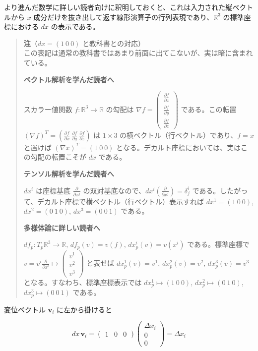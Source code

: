 \documentclass[a4paper,12pt,openany]{book}
\begin{document}
より進んだ数学に詳しい読者向けに釈明しておくと、これは入力された縦ベクトルから
\(x\)
成分だけを抜き出して返す線形演算子の行列表現であり、\(\mathbb R^3\)
の標準座標における \(dx\) の表示である。

\begin{quote}
\textbf{注}（\(dx = (1\ 0\ 0)\) と教科書との対応）\\
この表記は通常の教科書ではあまり前面に出てこないが、実は暗に含まれている。

\textbf{ベクトル解析を学んだ読者へ}

スカラー値関数 \(f:\mathbb R^3\to\mathbb R\) の勾配は
\(\nabla f = \begin{pmatrix}\frac{\partial f}{\partial x} \\ \frac{\partial f}{\partial y} \\ \frac{\partial f}{\partial z}\end{pmatrix}\)
である。この転置
\((\nabla f)^T = (\frac{\partial f}{\partial x}\ \frac{\partial f}{\partial y}\ \frac{\partial f}{\partial z})\)
は \(1\times3\) の横ベクトル（行ベクトル）であり、\(f=x\) と置けば
\((\nabla x)^T = (1\ 0\ 0)\)
となる。デカルト座標においては、実はこの勾配の転置こそが \(dx\) である。

\textbf{テンソル解析を学んだ読者へ}

\(dx^i\) は座標基底 \(\frac{\partial}{\partial x^j}\)
の双対基底なので、\(dx^i\left(\frac{\partial}{\partial x^j}\right)=\delta^i_j\)
である。したがって、デカルト座標で横ベクトル（行ベクトル）表示すれば
\(dx^1=(1\ 0\ 0)\), \(dx^2=(0\ 1\ 0)\), \(dx^3=(0\ 0\ 1)\) である。

\textbf{多様体論に詳しい読者へ}

\(df_p:T_p\mathbb R^3\to\mathbb R\), \(df_p(v)=v(f)\),
\(dx^i_p(v)=v(x^i)\) である。標準座標で
\(v=v^i\frac{\partial}{\partial x^i} \longmapsto \begin{pmatrix}v^1\\v^2\\v^3\end{pmatrix}\)
と表せば \(dx^1_p(v)=v^1\), \(dx^2_p(v)=v^2\), \(dx^3_p(v)=v^3\)
となる。すなわち、標準座標表示では \(dx^1_p\longmapsto(1\ 0\ 0)\),
\(dx^2_p\longmapsto(0\ 1\ 0)\), \(dx^3_p\longmapsto(0\ 0\ 1)\) である。
\end{quote}

変位ベクトル \(\mathbf{v}_i\) に左から掛けると

\[
dx\,\mathbf{v}_i
=
\begin{pmatrix} 1 & 0 & 0 \end{pmatrix}
\begin{pmatrix} \Delta x_i \\ 0 \\ 0 \end{pmatrix}
=
\Delta x_i
\]
\end{document}
